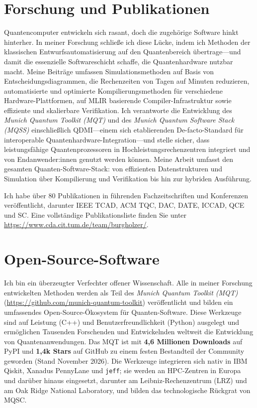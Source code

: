 \documentclass[10pt,a4paper, roman]{moderncv}        %
\begin{document}
\section{Forschung und Publikationen}
Quantencomputer entwickeln sich rasant, doch die zugehörige Software hinkt hinterher. In meiner Forschung schließe ich diese Lücke, indem ich Methoden der klassischen Entwurfsautomatisierung auf den Quantenbereich übertrage---und damit die essenzielle Softwareschicht schaffe, die Quantenhardware nutzbar macht.
Meine Beiträge umfassen Simulationsmethoden auf Basis von Entscheidungsdiagrammen, die Rechenzeiten von Tagen auf Minuten reduzieren, automatisierte und optimierte Kompilierungsmethoden für verschiedene Hardware-Plattformen, auf MLIR basierende Compiler-Infrastruktur sowie effiziente und skalierbare Verifikation.
Ich verantworte die Entwicklung des \emph{Munich Quantum Toolkit (MQT)} und des \emph{Munich Quantum Software Stack (MQSS)} einschließlich QDMI---einem sich etablierenden De-facto-Standard für interoperable Quantenhardware-Integration---und stelle sicher, dass leistungsfähige Quantenprozessoren in Hochleistungsrechenzentren integriert und von Endanwender:innen genutzt werden können.
Meine Arbeit umfasst den gesamten Quanten-Software-Stack: von effizienten Datenstrukturen und Simulation über Kompilierung und Verifikation bis hin zur hybriden Ausführung.

Ich habe über 80 Publikationen in führenden Fachzeitschriften und Konferenzen veröffentlicht, darunter IEEE TCAD, ACM TQC, DAC, DATE, ICCAD, QCE und SC. Eine vollständige Publikationsliste finden Sie unter \url{https://www.cda.cit.tum.de/team/burgholzer/}.

\section{Open-Source-Software}
Ich bin ein überzeugter Verfechter offener Wissenschaft. Alle in meiner Forschung entwickelten Methoden werden als Teil des \emph{Munich Quantum Toolkit (MQT)} (\url{https://github.com/munich-quantum-toolkit}) veröffentlicht und bilden ein umfassendes Open-Source-Ökosystem für Quanten-Software.
Diese Werkzeuge sind auf Leistung (C++) und Benutzerfreundlichkeit (Python) ausgelegt und ermöglichen Tausenden Forschenden und Entwickelnden weltweit die Entwicklung von Quantenanwendungen.
Das MQT ist mit \textbf{4,6 Millionen Downloads} auf PyPI und \textbf{1,4k Stars} auf GitHub zu einem festen Bestandteil der Community geworden (Stand November 2026).
Die Werkzeuge integrieren sich nativ in IBM Qiskit, Xanadus PennyLane und \texttt{jeff}; sie werden an HPC-Zentren in Europa und darüber hinaus eingesetzt, darunter am Leibniz-Rechenzentrum (LRZ) und am Oak Ridge National Laboratory, und bilden das technologische Rückgrat von MQSC.
\end{document}
